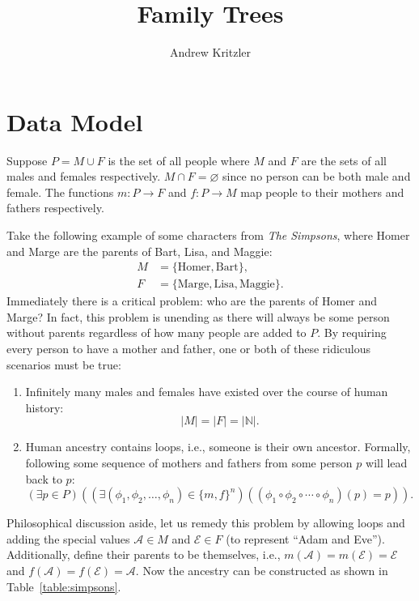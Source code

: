 \documentclass[letterpaper]{article}
\title{Family Trees}
\author{Andrew Kritzler}
\begin{document}
\maketitle

\section{Data Model}

Suppose \(P = M \cup F\) is the set of all people where \(M\) and \(F\) are the sets of all males and females respectively.
\(M \cap F = \varnothing{}\) since no person can be both male and female.
The functions \(m : P \to F\) and \(f : P \to M\) map people to their mothers and fathers respectively.

Take the following example of some characters from \textit{The Simpsons}, where Homer and Marge are the parents of Bart, Lisa, and Maggie:
\[
    \begin{aligned}
        M & = \{\text{Homer}, \text{Bart}\},                \\
        F & = \{\text{Marge}, \text{Lisa}, \text{Maggie}\}.
    \end{aligned}
\]
Immediately there is a critical problem: who are the parents of Homer and Marge?
In fact, this problem is unending as there will always be some person without parents regardless of how many people are added to \(P\).
By requiring every person to have a mother and father, one or both of these ridiculous scenarios must be true:
\begin{enumerate}
    \item Infinitely many males and females have existed over the course of human history:
          \[
              |M| = |F| = |\mathbb{N}|.
          \]
    \item Human ancestry contains loops, i.e., someone is their own ancestor. Formally, following some sequence of mothers and fathers from some person \(p\) will lead back to \(p\):
          \[
              (\exists p \in P)
              (
              (\exists (\phi_1, \phi_2, \dotsc, \phi_n) \in {\{m, f\}}^n)
              ( (\phi_1 \circ \phi_2 \circ \cdots \circ \phi_n)(p) = p)
              ).
          \]
\end{enumerate}

Philosophical discussion aside, let us remedy this problem by allowing loops and adding the special values \(\mathcal{A} \in M\) and \(\mathcal{E} \in F\) (to represent ``Adam and Eve'').
Additionally, define their parents to be themselves, i.e., \(m(\mathcal{A}) = m(\mathcal{E}) = \mathcal{E}\) and \(f(\mathcal{A}) = f(\mathcal{E}) = \mathcal{A}\).
Now the ancestry can be constructed as shown in Table~\ref{table:simpsons}.
\end{document}
